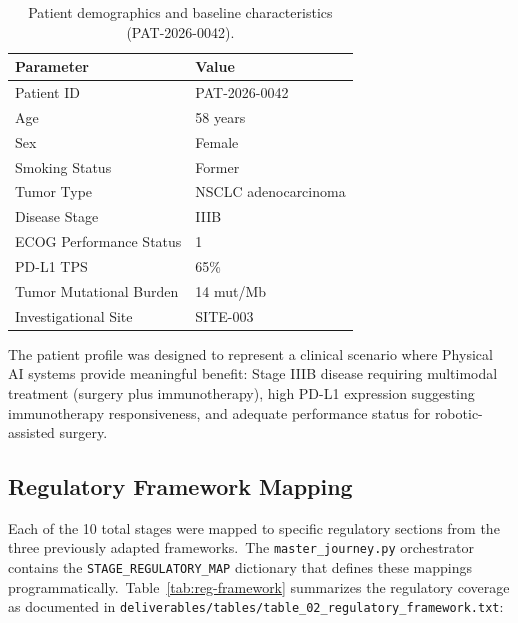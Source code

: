 \documentclass{article}
\begin{document}
\begin{table}[H]
\centering
\caption{Patient demographics and baseline characteristics (PAT-2026-0042).}
\label{tab:demographics}
\small
\begin{tabularx}{\textwidth}{@{}L{4.5cm}L{7.5cm}@{}}
\toprule
\textbf{Parameter} & \textbf{Value} \\
\midrule
Patient ID & PAT-2026-0042 \\
Age & 58 years \\
Sex & Female \\
Smoking Status & Former \\
Tumor Type & NSCLC adenocarcinoma \\
Disease Stage & IIIB \\
ECOG Performance Status & 1 \\
PD-L1 TPS & 65\% \\
Tumor Mutational Burden & 14 mut/Mb \\
Investigational Site & SITE-003 \\
\bottomrule
\end{tabularx}
\end{table}

The patient profile was designed to represent a clinical scenario where Physical AI systems provide meaningful benefit: Stage IIIB disease requiring multimodal treatment (surgery plus immunotherapy), high PD-L1 expression suggesting immunotherapy responsiveness, and adequate performance status for robotic-assisted surgery.

\subsection{Regulatory Framework Mapping}

Each of the 10 total stages were mapped to specific regulatory sections from the three previously adapted frameworks.\ The \texttt{master\_journey.py} orchestrator contains the \texttt{STAGE\_REGULATORY\_MAP} dictionary that defines these mappings programmatically.\ Table~\ref{tab:reg-framework} summarizes the regulatory coverage as documented in \texttt{deliverables/tables/table\_02\_regulatory\_framework.txt}:
\end{document}
